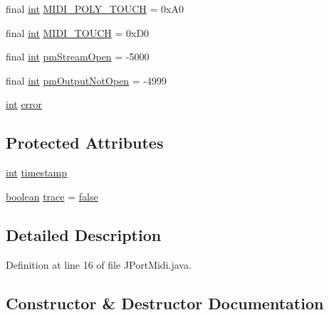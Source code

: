 \begin{DoxyCompactItemize}
final \hyperlink{xmltok_8h_a5a0d4a5641ce434f1d23533f2b2e6653}{int} \hyperlink{classjportmidi_1_1_j_port_midi_a66b8a5b39d1e8201501dcf9df09c52f4}{M\+I\+D\+I\+\_\+\+P\+O\+L\+Y\+\_\+\+T\+O\+U\+CH} = 0x\+A0
\item 
final \hyperlink{xmltok_8h_a5a0d4a5641ce434f1d23533f2b2e6653}{int} \hyperlink{classjportmidi_1_1_j_port_midi_abab85600cca100f39f96263fb2733a41}{M\+I\+D\+I\+\_\+\+T\+O\+U\+CH} = 0x\+D0
\item 
final \hyperlink{xmltok_8h_a5a0d4a5641ce434f1d23533f2b2e6653}{int} \hyperlink{classjportmidi_1_1_j_port_midi_a5832f134146052039518c4dc799ac3b1}{pm\+Stream\+Open} = -\/5000
\item 
final \hyperlink{xmltok_8h_a5a0d4a5641ce434f1d23533f2b2e6653}{int} \hyperlink{classjportmidi_1_1_j_port_midi_a7c80486147954f40134a2582f6eb2297}{pm\+Output\+Not\+Open} = -\/4999
\item 
\hyperlink{xmltok_8h_a5a0d4a5641ce434f1d23533f2b2e6653}{int} \hyperlink{classjportmidi_1_1_j_port_midi_a32a85b5d37a27533631760d985e59c38}{error}
\end{DoxyCompactItemize}
\subsection*{Protected Attributes}
\begin{DoxyCompactItemize}
\item 
\hyperlink{xmltok_8h_a5a0d4a5641ce434f1d23533f2b2e6653}{int} \hyperlink{classjportmidi_1_1_j_port_midi_af439d1f2427e3b7727e7419853ef66d2}{timestamp}
\item 
\hyperlink{cext_8h_a7670a4e8a07d9ebb00411948b0bbf86d}{boolean} \hyperlink{classjportmidi_1_1_j_port_midi_acc48f9ed73d3d075ffc7f898db8b8b5a}{trace} = \hyperlink{mac_2config_2i386_2lib-src_2libsoxr_2soxr-config_8h_a65e9886d74aaee76545e83dd09011727}{false}
\end{DoxyCompactItemize}


\subsection{Detailed Description}


Definition at line 16 of file J\+Port\+Midi.\+java.



\subsection{Constructor \& Destructor Documentation}
